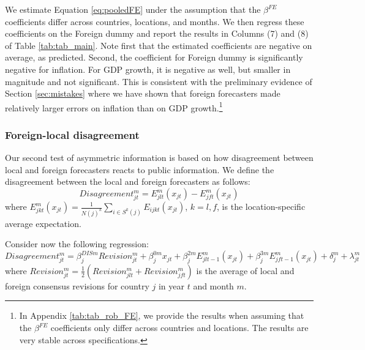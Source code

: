 
We estimate Equation \eqref{eq:pooledFE} under the assumption that the $\beta^{FE}$ coefficients differ across countries, locations, and months. We then regress these coefficients on the Foreign dummy and report the results in Columns (7) and (8) of Table \ref{tab:tab_main}. Note first that the estimated coefficients are negative on average, as predicted. Second, the coefficient for Foreign dummy is significantly negative for inflation. For GDP growth, it is negative as well, but smaller in magnitude and not significant. This is consistent with the preliminary evidence of Section \ref{sec:mistakes} where we have shown that foreign forecasters made relatively larger errors on inflation than on GDP growth.\footnote{In Appendix \ref{tab:tab_rob_FE}, we provide the results when assuming that the $\beta^{FE}$ coefficients only differ across countries and locations. The results are very stable across specifications.}

\subsubsection{Foreign-local disagreement}

Our second test of asymmetric information is based on how disagreement between local and foreign forecasters reacts to public information.
We define the disagreement between the local and foreign forecasters as follows:
\begin{equation}
Disagreement_{jt}^m=E_{jlt}^m(x_{jt})-E_{jft}^m(x_{jt})
\label{eq:dis}
\end{equation}
where $E_{jkt}^m(x_{jt})=\frac{1}{N(j)^k}\sum_{i\in\textit{S}^k(j)}E_{ijkt}(x_{jt})$, $k=l,f$, is the location-specific average expectation.

Consider now the following regression:
\begin{equation}Disagreement_{jt}^m=\beta^{DISm}_{j}Revision_{jt}^m+\beta^{0m}_{j}x_{jt}+\beta^{2m}_jE_{jlt-1}^m(x_{jt})+\beta^{3m}_jE_{jft-1}^m(x_{jt})+\delta_{j}^m+\lambda_{jt}^m\label{eq:disagreement}\end{equation}
where $Revision_{jt}^m=\frac{1}{2}(Revision_{jlt}^m+Revision_{jft}^m)$ is the average of local and foreign consensus revisions for country $j$ in year $t$ and month $m$.

